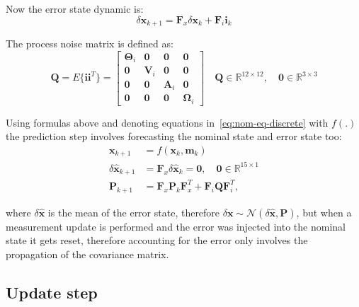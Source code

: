 Now the error state dynamic is:
\begin{equation}
    \delta\mathbf{x}_{k+1}=\mathbf{F}_x\delta\mathbf{x}_k+\mathbf{F}_{i}\mathbf{i}_k
    \label{eq:error-state-dyn}
\end{equation}

The process noise matrix is defined as:
\begin{equation}
    \mathbf{Q}=E\{\mathbf{i}\mathbf{i}^T\}=\begin{bmatrix}
        \boldsymbol{\Theta}_i & \mathbf{0} & \mathbf{0} & \mathbf{0} \\
        \mathbf{0} & \mathbf{V}_i & \mathbf{0} & \mathbf{0} \\
        \mathbf{0} & \mathbf{0} & \mathbf{A}_i & \mathbf{0} \\
        \mathbf{0} & \mathbf{0} & \mathbf{0} & \boldsymbol{\Omega}_i
    \end{bmatrix} \quad \mathbf{Q}\in\mathbb{R}^{12\times 12},\quad \mathbf{0}\in\mathbb{R}^{3\times 3}
\end{equation}

Using formulas above and denoting equations in~\eqref{eq:nom-eq-discrete} with $f(.)$ the prediction step involves forecasting the nominal state and error state too:
\begin{subequations}
\begin{align}
    \mathbf{x}_{k+1} &= f(\mathbf{x}_k, \mathbf{m}_k) \\
    \delta\hat{\mathbf{x}}_{k+1} &= \mathbf{F}_x\delta\hat{\mathbf{x}}_k=\mathbf{0}, \quad \mathbf{0}\in\mathbb{R}^{15\times 1} \label{eq:err-state-dyn}\\
    \mathbf{P}_{k+1} &= \mathbf{F}_x\mathbf{P}_k\mathbf{F}_x^T+ \mathbf{F}_i\mathbf{Q}\mathbf{F}_i^T,
    \label{eq:err-cov-prop}
\end{align}
\end{subequations}

where $\delta\hat{\mathbf{x}}$ is the mean of the error state, therefore $\delta\mathbf{x}\sim\mathcal{N}(\delta\hat{\mathbf{x}},\mathbf{P})$, but when a measurement update is performed and the error was injected into the nominal state it gets reset, therefore accounting for the error only involves the propagation of the covariance matrix.

\subsection{Update step}

